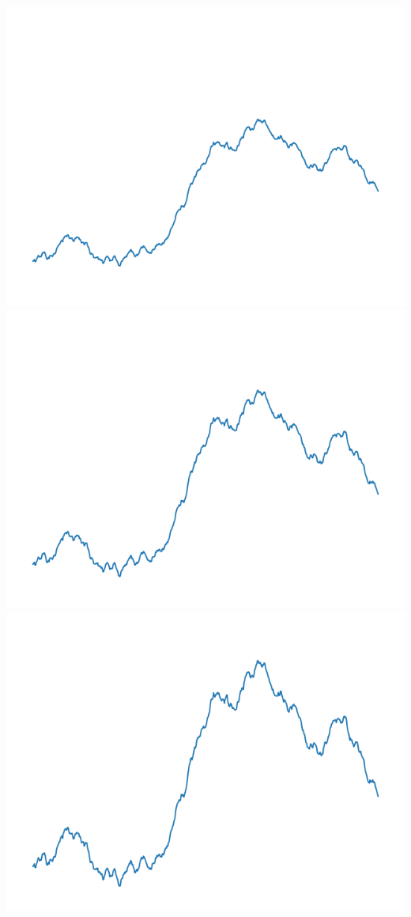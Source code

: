 \documentclass[11pt,class=report,crop=false]{standalone}
\begin{document}
\begin{exemple}
\begin{center}
\includegraphics[scale=\myscale,scale=0.2]{figures/landscape-05-15}
\includegraphics[scale=\myscale,scale=0.2]{figures/landscape-05-20}
\includegraphics[scale=\myscale,scale=0.2]{figures/landscape-05-25}

\end{center}
\end{exemple}
\end{document}

